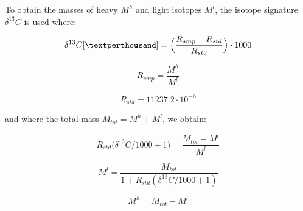 \documentclass[]{article}
\begin{document}
To obtain the masses of heavy \(M^h\) and light isotopes \(M^l\), the
isotope signature \(\delta ^{13}C\) is used where:

\begin{equation} 
\delta ^{13}C [\textperthousand] = \Big(\frac{R_{smp} - R_{std}}{R_{std}}\Big)\cdot 1000
\end{equation}

\begin{equation} 
R_{smp} = \frac{M^h}{M^l} 
\end{equation}

\begin{equation} 
R_{std} = 11237.2 \cdot 10^{-6}
\end{equation}

and where the total mass \(M_{tot} = M^h + M^l\), we obtain:

\begin{equation} 
R_{std}\Big(\delta ^{13}C/1000+1 \Big)= \frac{M_{tot}-M^l}{M^l}
\end{equation}

\begin{equation} 
M^l = \frac{M_{tot}}{1+R_{std}(\delta ^{13}C/1000+1)}
\end{equation}

\begin{equation} 
M^h = M_{tot} - M^l 
\end{equation}

\renewcommand\refname{References}

\end{document}
